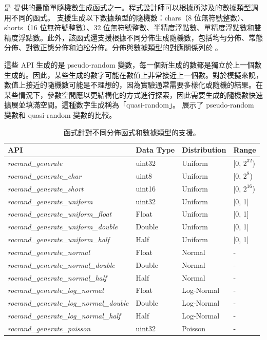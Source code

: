  是  提供的最簡單隨機數生成函式之一。程式設計師可以根據所涉及的數據類型調用不同的函式。 支援生成以下數據類型的隨機數：chars（8 位無符號整數）、shorts（16 位無符號整數）、32 位無符號整數、半精度浮點數、單精度浮點數和雙精度浮點數。此外，該函式還支援根據不同分佈生成隨機數，包括均勻分佈、常態分佈、對數正態分佈和泊松分佈。分佈與數據類型的對應關係列於 。

這些 API 生成的是 pseudo-random 變數，每一個新生成的數都是獨立於上一個數生成的。因此，某些生成的數字可能在數值上非常接近上一個數。對於模擬來說，數值上接近的隨機數可能是不理想的，因為實驗通常需要多樣化或隨機的結果。在某些情況下，參數空間應以更結構化的方式進行探索，因此需要生成的隨機數快速擴展並填滿空間。這種數字生成稱為「quasi-random」。 展示了 pseudo-random 變數和 quasi-random 變數的比較。

\begin{table}[h!]
    \centering
    \caption{ 函式針對不同分佈函式和數據類型的支援。}
    \label{tab:rocRAND}
    \begin{tabular}{llll}
        \hline
        \textbf{API} & \textbf{Data Type} & \textbf{Distribution} & \textbf{Range} \\ \hline
        \textit{rocrand\_generate} & uint32 & Uniform & [0, $2^{32}$) \\ 
        \textit{rocrand\_generate\_char} & uint8 & Uniform & [0, $2^{8}$) \\ 
        \textit{rocrand\_generate\_short} & uint16 & Uniform & [0, $2^{16}$) \\ 
        \textit{rocrand\_generate\_uniform} & uint32 & Uniform & [0, 1] \\ 
        \textit{rocrand\_generate\_uniform\_float} & Float & Uniform & [0, 1] \\ 
        \textit{rocrand\_generate\_uniform\_double} & Double & Uniform & [0, 1] \\ 
        \textit{rocrand\_generate\_uniform\_half} & Half & Uniform & [0, 1] \\ 
        \textit{rocrand\_generate\_normal} & Float & Normal & - \\ 
        \textit{rocrand\_generate\_normal\_double} & Double & Normal & - \\ 
        \textit{rocrand\_generate\_normal\_half} & Half & Normal & - \\ 
        \textit{rocrand\_generate\_log\_normal} & Float & Log-Normal & - \\ 
        \textit{rocrand\_generate\_log\_normal\_double} & Double & Log-Normal & - \\ 
        \textit{rocrand\_generate\_log\_normal\_half} & Half & Log-Normal & - \\ 
        \textit{rocrand\_generate\_poisson} & uint32 & Poisson & - \\ \hline
    \end{tabular}
\end{table}

